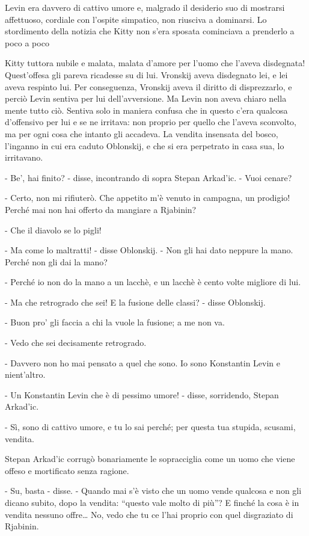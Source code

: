 \enlargethispage{\baselineskip}
Levin era davvero di cattivo umore e, malgrado il desiderio suo di mostrarsi affettuoso, cordiale con l'ospite simpatico, non riusciva a dominarsi. Lo stordimento della notizia che Kitty non s'era sposata cominciava a prenderlo a poco a poco 

Kitty tuttora nubile e malata, malata d'amore per l'uomo che l'aveva disdegnata! Quest'offesa gli pareva ricadesse su di lui. Vronskij aveva disdegnato lei, e lei aveva respinto lui. Per conseguenza, Vronskij aveva il diritto di disprezzarlo, e perciò Levin sentiva per lui dell'avversione. Ma Levin non aveva chiaro nella mente tutto ciò. Sentiva solo in maniera confusa che in questo c'era qualcosa d'offensivo per lui e se ne irritava: non proprio per quello che l'aveva sconvolto, ma per ogni cosa che intanto gli accadeva. La vendita insensata del bosco, l'inganno in cui era caduto Oblonskij, e che si era perpetrato in casa sua, lo irritavano. 

- Be', hai finito? - disse, incontrando di sopra Stepan Arkad'ic. - Vuoi cenare? 

- Certo, non mi rifiuterò. Che appetito m'è venuto in campagna, un prodigio! Perché mai non hai offerto da mangiare a Rjabinin? 

- Che il diavolo se lo pigli! 

- Ma come lo maltratti! - disse Oblonskij. - Non gli hai dato neppure la mano. Perché non gli dai la mano? 

- Perché io non do la mano a un lacchè, e un lacchè è cento volte migliore di lui. 

- Ma che retrogrado che sei! E la fusione delle classi? - disse Oblonskij. 

- Buon pro' gli faccia a chi la vuole la fusione; a me non va. 

- Vedo che sei decisamente retrogrado. 

- Davvero non ho mai pensato a quel che sono. Io sono Konstantin Levin e nient'altro. 

- Un Konstantin Levin che è di pessimo umore! - disse, sorridendo, Stepan Arkad'ic. 

- Sì, sono di cattivo umore, e tu lo sai perché; per questa tua stupida, scusami, vendita. 

Stepan Arkad'ic corrugò bonariamente le sopracciglia come un uomo che viene offeso e mortificato senza ragione. 

- Su, basta - disse. - Quando mai s'è visto che un uomo vende qualcosa e non gli dicano subito, dopo la vendita: ``questo vale molto di più''? E finché la cosa è in vendita nessuno offre\ldots{} No, vedo che tu ce l'hai proprio con quel disgraziato di Rjabinin. 

